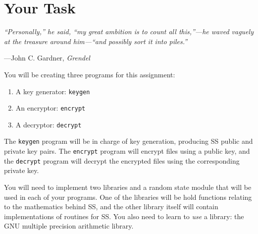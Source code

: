 \section{Your Task}
\epigraph{\emph{``Personally,'' he said, ``my great ambition is to count all this,''---he waved
vaguely at the treasure around him---``and possibly sort it into piles.''}}{---John C.\xspace Gardner, \emph{Grendel}}

\noindent You will be creating three programs for this assignment:
\begin{enumerate}
  \item A key generator: \texttt{keygen}
  \item An encryptor: \texttt{encrypt}
  \item A decryptor: \texttt{decrypt}
\end{enumerate}

The \texttt{keygen} program will be in charge of key generation,
producing SS public and private key pairs. The \texttt{encrypt} program
will encrypt files using a public key, and the \texttt{decrypt} program
will decrypt the encrypted files using the corresponding private key.

You will need to implement two libraries and a random state module that
will be used in each of your programs. One of the libraries will be hold
functions relating to the mathematics behind SS, and the other library
itself will contain implementations of routines for SS\@. You also need
to learn to \emph{use} a library: the GNU multiple precision arithmetic
library.
